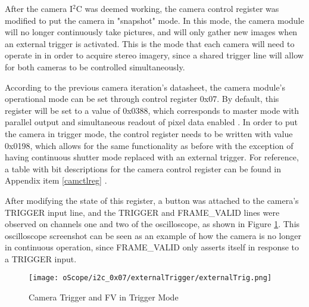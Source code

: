 \par
After the camera I$^2$C was deemed working, the camera control register was modified to put the camera in "snapshot" mode. In this mode, the camera module will no longer continuously take pictures, and will only gather new images when an external trigger is activated. This is the mode that each camera will need to operate in in order to acquire stereo imagery, since a shared trigger line will allow for both cameras to be controlled simultaneously.
\par
According to the previous camera iteration's datasheet, the camera module's operational mode can be set through control register 0x07. By default, this register will be set to a value of 0x0388, which corresponds to master mode with parallel output and simultaneous readout of pixel data enabled \cite{mt9v032}. In order to put the camera in trigger mode, the control register needs to be written with value 0x0198, which allows for the same functionality as before with the exception of having continuous shutter mode replaced with an external trigger. For reference, a table with bit descriptions for the camera control register can be found in Appendix item \ref{camctlreg} \cite{mt9v032}.
\par
After modifying the state of this register, a button was attached to the camera's TRIGGER input line, and the TRIGGER and FRAME\_VALID lines were observed on channels one and two of the oscilloscope, as shown in Figure \ref{camInTrigMode}. This oscilloscope screenshot can be seen as an example of how the camera is no longer in continuous operation, since FRAME\_VALID only asserts itself in response to a TRIGGER input. 
\begin{figure}[H]
	\centerline{\texttt{[image: oScope/i2c\_0x07/externalTrigger/externalTrig.png]}}
	\caption{Camera Trigger and FV in Trigger Mode}
	\label{camInTrigMode}
\end{figure}

